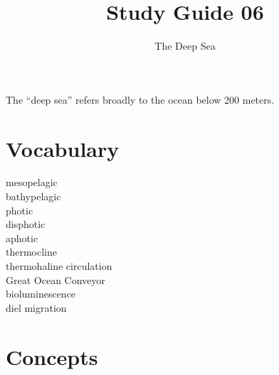 \documentclass[nofonts, letterpaper]{tufte-handout}
\title{Study Guide 06}
\author{The Deep Sea}
\date{} %
\begin{document}
\maketitle	%

The “deep sea” refers broadly to the ocean below 200 meters.

\section{Vocabulary}
\vspace{-1\baselineskip}
\begin{multicols}{2}
mesopelagic \\
bathypelagic \\
photic \\
disphotic \\
aphotic \\
thermocline \\
thermohaline circulation \\
Great Ocean Conveyor \\
bioluminescence \\
diel migration
\end{multicols}

\section{Concepts}
\end{document}
